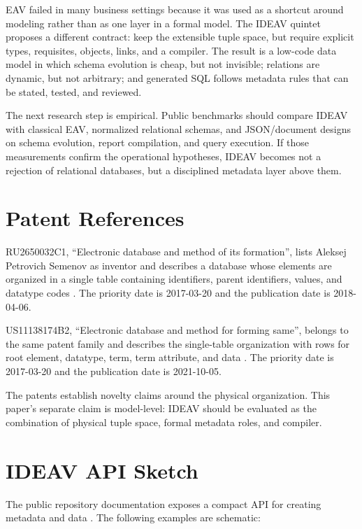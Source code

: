 \documentclass[11pt]{article}
\begin{document}
EAV failed in many business settings because it was used as a shortcut around
modeling rather than as one layer in a formal model. The IDEAV quintet proposes
a different contract: keep the extensible tuple space, but require explicit
types, requisites, objects, links, and a compiler. The result is a low-code data
model in which schema evolution is cheap, but not invisible; relations are
dynamic, but not arbitrary; and generated SQL follows metadata rules that can be
stated, tested, and reviewed.

The next research step is empirical. Public benchmarks should compare IDEAV with
classical EAV, normalized relational schemas, and JSON/document designs on
schema evolution, report compilation, and query execution. If those measurements
confirm the operational hypotheses, IDEAV becomes not a rejection of relational
databases, but a disciplined metadata layer above them.

\appendix

\section{Patent References}

RU2650032C1, ``Electronic database and method of its formation'', lists Aleksej
Petrovich Semenov as inventor and describes a database whose elements are
organized in a single table containing identifiers, parent identifiers, values,
and datatype codes \citep{semenov2018ru}. The priority date is 2017-03-20 and
the publication date is 2018-04-06.

US11138174B2, ``Electronic database and method for forming same'', belongs to
the same patent family and describes the single-table organization with rows
for root element, datatype, term, term attribute, and data
\citep{semenov2021us}. The priority date is 2017-03-20 and the publication date
is 2021-10-05.

The patents establish novelty claims around the physical organization. This
paper's separate claim is model-level: IDEAV should be evaluated as the
combination of physical tuple space, formal metadata roles, and compiler.

\section{IDEAV API Sketch}

The public repository documentation exposes a compact API for creating metadata
and data \citep{integramMcp2026}. The following examples are schematic:
\end{document}
